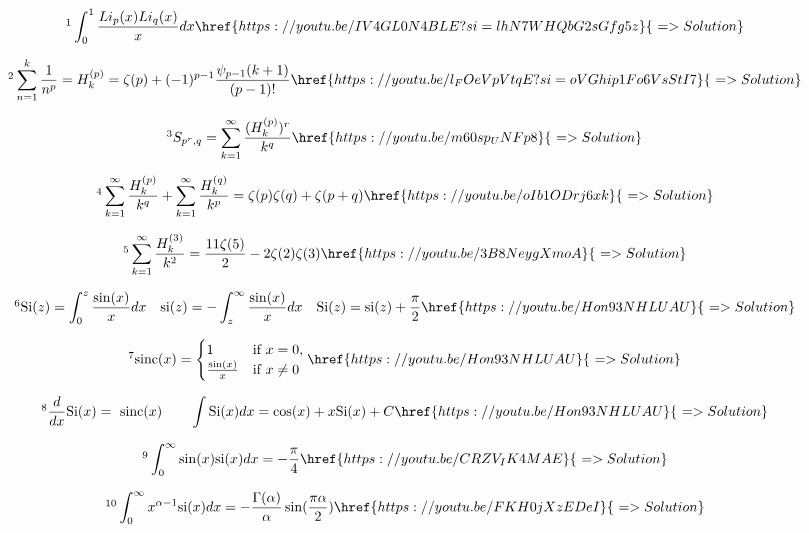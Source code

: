 \documentclass[12pt]{article}
\begin{document}
 
\[ \footnote{ I am getting s surge of poly-logarithms} \int_0^1 \frac{Li_p(x) Li_q(x)}{x} dx    \href{https://youtu.be/IV4GL0N4BLE?si=lhN7WHQbG2sGfg5z}{\,\, => Solution}  \]
 
\[ \footnote{ Relation between Generalised Harmonic Number and Poly-Gamma function} \sum_{n=1}^{k} \frac{1}{n^p} = H_k^{(p)} = \zeta(p) + (-1)^{p-1} \frac{\psi_{p-1}(k+1)}{(p-1)!}   \href{https://youtu.be/l_FOeVpVtqE?si=oVGhip1Fo6VsStI7}{\,\, => Solution}  \]
 
\[ \footnote{ Integral Representation for r=1} S_{p^r,q} = \sum_{k=1}^{\infty} \frac{(H_k^{(p)})^r}{k^q}   \href{https://youtu.be/m60sp_UNFp8}{\,\, => Solution}  \] 
 
\[ \footnote{ A nice and beautiful symmetric formula}  \sum_{k=1}^{\infty} \frac{H_k^{(p)}}{k^q} + \sum_{k=1}^{\infty} \frac{H_k^{(q)}}{k^p} = \zeta(p) \zeta(q) + \zeta(p+q)   \href{https://youtu.be/oIb1ODrj6xk}{\,\, => Solution}  \]


\[ \footnote{ Finding the value of a Euler sum} \sum_{k=1}^{\infty} \frac{H_k^{(3)}}{k^2} = \frac{11\zeta(5)}{2} - 2 \zeta(2) \zeta(3)   \href{https://youtu.be/3B8NeygXmoA}{\,\, => Solution}  \]

\[ \footnote{ A short and sweet introduction to Sine Integral function} \text{Si}(z)=\int_0^z \frac{\sin(x)}{x} dx \quad \text{si}(z) = - \int_z^{\infty} \frac{\sin(x)}{x}dx \quad \text{Si}(z) = \text{si}(z)+ \frac{\pi}{2}   \href{https://youtu.be/Hon93NHLUAU}{\,\, => Solution} \]

\[ \footnote{ Definition of sinc function} \text{sinc}(x)=
\begin{cases} 
1 & \text{if } x = 0, \\
\frac{\sin(x)}{x} & \text{if } x \neq 0
\end{cases}     \href{https://youtu.be/Hon93NHLUAU}{\,\, => Solution}  
\]

\[ \footnote{ Derivative and antiderivative of sine integral function} \frac{d}{dx}\text{Si}(x) =\text{ sinc}(x)\quad \quad  \int \text{Si}(x) dx = \cos(x) + x \text{Si}(x) + C      \href{https://youtu.be/Hon93NHLUAU}{\,\, => Solution}  
\] 

\[ \footnote{ Doesn't this combination look nice?} \int_0^{\infty}  \sin(x) \text{si}(x) dx = - \frac{\pi}{4}      \href{https://youtu.be/CRZV_IK4MAE}{\,\, => Solution}   \]

\[\footnote{Mellin Transform of si(x)} \int_0^{\infty} x^{\alpha - 1} \text{si}(x) dx = - \frac{\Gamma(\alpha)}{\alpha} \sin(\frac{\pi \alpha}{2})      \href{https://youtu.be/FKH0jXzEDeI}{\,\, => Solution}   \]
\end{document}
